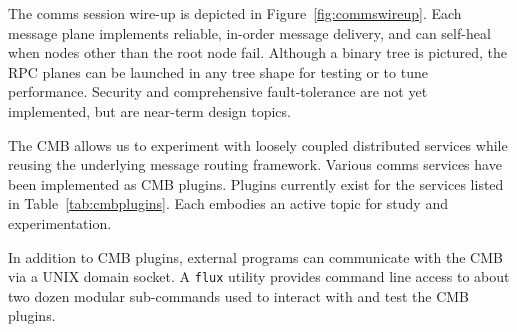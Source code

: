 The comms session wire-up is depicted in Figure~\ref{fig:commswireup}.
Each message plane implements reliable, in-order message delivery, and
can self-heal when nodes other than the root node fail.
Although a binary tree is pictured, the RPC planes can be launched in
any tree shape for testing or to tune performance.
Security and comprehensive fault-tolerance are not yet implemented,
but are near-term design topics.

The CMB allows us to experiment with loosely coupled distributed services
while reusing the underlying message routing framework. Various comms
services have been implemented as CMB plugins. Plugins currently exist for
the services listed in Table~\ref{tab:cmbplugins}.
Each embodies an active topic for study and experimentation. %

In addition to CMB plugins, external programs can communicate with the CMB
via a UNIX domain socket.  A {\tt flux} utility provides command line access
to about two dozen
modular sub-commands used to interact with and test the CMB plugins.

